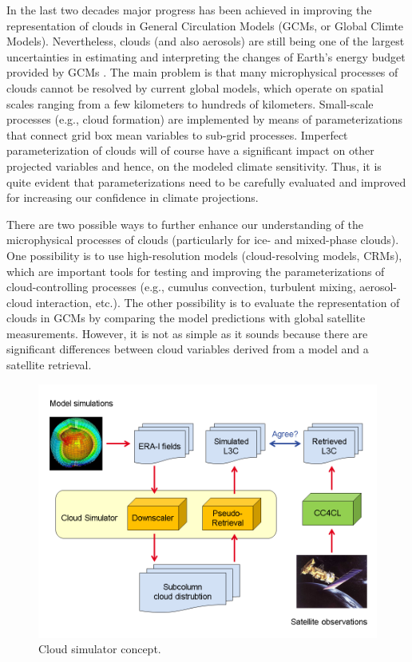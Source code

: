 
In the last two decades major progress has been achieved in improving the representation 
of clouds in General Circulation Models (GCMs, or Global Climte Models). 
Nevertheless, clouds (and also aerosols) are still being one of the largest uncertainties 
in estimating and interpreting the changes of Earth's energy budget provided by GCMs \cite{IPCC2013}. 
The main problem is that many microphysical processes of clouds
cannot be resolved by current global models, which operate on spatial scales ranging 
from a few kilometers to hundreds of kilometers. Small-scale processes (e.g., cloud formation) 
are implemented by means of parameterizations that connect grid box mean variables to sub-grid processes.
Imperfect parameterization of clouds will of course have a significant impact on other projected variables 
and hence, on the modeled climate sensitivity.
Thus, it is quite evident that parameterizations need to be carefully evaluated and improved 
for increasing our confidence in climate projections.

There are two possible ways to further enhance our understanding of the 
microphysical processes of clouds (particularly for ice- and mixed-phase clouds).
One possibility is to use high-resolution models (cloud-resolving models, CRMs), which
are important tools for testing and improving the parameterizations of cloud-controlling processes
(e.g., cumulus convection, turbulent mixing, aerosol-cloud interaction, etc.).
The other possibility is to evaluate the representation of clouds in GCMs by comparing
the model predictions with global satellite measurements.
However, it is not as simple as it sounds because there are significant differences
between cloud variables derived from a model and a satellite retrieval.

\begin{figure}[!htp]\centering
 \includegraphics[scale=0.5]{./figures/simulator_overview.png}
  \caption[Concept of the cloud simulator.]
{Cloud simulator concept.}\label{fig:sim_over}
\end{figure}


